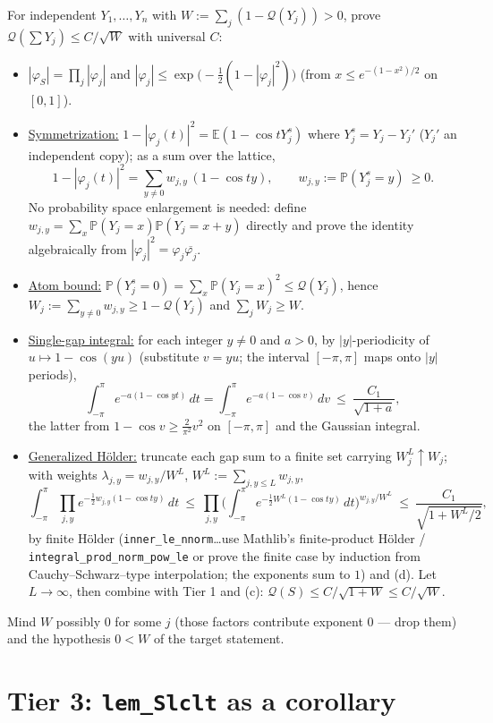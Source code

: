 \documentclass[11pt]{article}
\theoremstyle{plain}
\theoremstyle{remark}
\newcommand{\E}{\mathbb{E}}\newcommand{\PP}{\mathbb{P}}\newcommand{\R}{\mathbb{R}}\newcommand{\Z}{\mathbb{Z}}
\newcommand{\Q}{\mathcal Q}
\begin{document}
For independent $Y_1,\dots,Y_n$ with $W:=\sum_j(1-\Q(Y_j))>0$, prove
$\Q(\sum Y_j)\le C/\sqrt W$ with universal $C$:
\begin{itemize}
\item[(a)] $|\varphi_S|=\prod_j|\varphi_j|$ and
$|\varphi_j|\le\exp\big(-\tfrac12(1-|\varphi_j|^2)\big)$ (from
$x\le e^{-(1-x^2)/2}$ on $[0,1]$).
\item[(b)] \underline{Symmetrization:} $1-|\varphi_j(t)|^2=\E(1-\cos tY^s_j)$
where $Y^s_j=Y_j-Y_j'$ ($Y_j'$ an independent copy); as a sum over the lattice,
\[
  1-|\varphi_j(t)|^2=\sum_{y\ne0}w_{j,y}\,(1-\cos ty),\qquad
  w_{j,y}:=\PP(Y^s_j=y)\ \ge0 .
\]
No probability space enlargement is needed: define
$w_{j,y}=\sum_x\PP(Y_j=x)\PP(Y_j=x+y)$ directly and prove the identity
algebraically from $|\varphi_j|^2=\varphi_j\overline{\varphi_j}$.
\item[(c)] \underline{Atom bound:} $\PP(Y^s_j=0)=\sum_x\PP(Y_j=x)^2\le\Q(Y_j)$,
hence $W_j:=\sum_{y\ne0}w_{j,y}\ge1-\Q(Y_j)$ and $\sum_jW_j\ge W$.
\item[(d)] \underline{Single-gap integral:} for each integer $y\ne0$ and $a>0$,
by $|y|$-periodicity of $u\mapsto1-\cos(yu)$ (substitute $v=yu$; the interval
$[-\pi,\pi]$ maps onto $|y|$ periods),
\[
  \int_{-\pi}^{\pi}e^{-a(1-\cos yt)}\,dt=\int_{-\pi}^{\pi}e^{-a(1-\cos v)}\,dv
  \ \le\ \frac{C_1}{\sqrt{1+a}},
\]
the latter from $1-\cos v\ge\tfrac2{\pi^2}v^2$ on $[-\pi,\pi]$ and the Gaussian
integral.
\item[(e)] \underline{Generalized H\"older:} truncate each gap sum to a finite
set carrying $W_j^L\uparrow W_j$; with weights $\lambda_{j,y}=w_{j,y}/W^L$,
$W^L:=\sum_{j,y\le L}w_{j,y}$,
\[
  \int_{-\pi}^{\pi}\prod_{j,y}e^{-\frac12w_{j,y}(1-\cos ty)}\,dt
  \ \le\ \prod_{j,y}\Big(\int_{-\pi}^{\pi}
  e^{-\frac12W^L(1-\cos ty)}\,dt\Big)^{w_{j,y}/W^L}
  \ \le\ \frac{C_1}{\sqrt{1+W^L/2}},
\]
by finite H\"older (\texttt{inner\_le\_nnorm}\dots use Mathlib's
finite-product H\"older / \texttt{integral\_prod\_norm\_pow\_le} or prove the
finite case by induction from Cauchy--Schwarz--type interpolation; the
exponents sum to $1$) and (d). Let $L\to\infty$, then combine with Tier 1 and
(c): $\Q(S)\le C/\sqrt{1+W}\le C/\sqrt W$.
\end{itemize}
Mind $W$ possibly $0$ for some $j$ (those factors contribute exponent $0$ ---
drop them) and the hypothesis $0<W$ of the target statement.

\section*{Tier 3: \texttt{lem\_Slclt} as a corollary}
\end{document}
